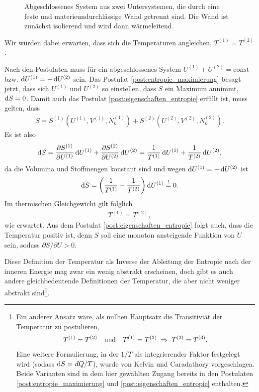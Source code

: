 \begin{figure}[htbp]
    \centering
    \tfigDoppelsystemUSfesteWaermeleitendeWand
    \caption{Abgeschlossenes System aus zwei Untersystemen, die durch eine feste und materieundurchlässige Wand getrennt sind. Die Wand ist zunächst isolierend und wird dann wärmeleitend.}
    \label{fig:DoppelsystemUSfesteWaermeleitendeWand}
\end{figure}

Wir würden dabei erwarten, dass sich die Temperaturen angleichen, $T^{(1)}=T^{(2)}$. 

Nach den Postulaten muss für ein abgeschlossenes System $U^{(1)}+U^{(2)} = \mathrm{const}$ bzw. $\mathop{}\!\mathrm{d} U^{(1)} = -\mathop{}\!\mathrm{d} U^{(2)}$ sein. Das Postulat \ref{post:entropie_maximierung} besagt jetzt, dass sich $U^{(1)}$ und $U^{(2)}$ so einstellen, dass $S$ ein Maximum annimmt, $\mathop{}\!\mathrm{d} S=0$. Damit auch das Postulat \ref{post:eigenschaften_entropie} erfüllt ist, muss gelten, dass
\begin{align*}
    S=S^{(1)}\left(U^{(1)},V^{(1)},N^{(1)}_k\right) + S^{(2)}\left(U^{(2)},V^{(2)},N^{(2)}_k\right). 
\end{align*}
Es ist also 
\begin{align*}
    \mathop{}\!\mathrm{d} S = \frac{\partial S^{(1)}}{\partial U^{(1)}}\mathop{}\!\mathrm{d} U^{(1)}+ \frac{\partial S^{(2)}}{\partial U^{(2)}}\mathop{}\!\mathrm{d} U^{(2)} = \frac{1}{T^{(1)}}\mathop{}\!\mathrm{d} U^{(1)} + \frac{1}{T^{(2)}}\mathop{}\!\mathrm{d} U^{(2)},
\end{align*}
da die Volumina und Stoffmengen konstant sind und wegen $\mathop{}\!\mathrm{d} U^{(1)} = -\mathop{}\!\mathrm{d} U^{(2)}$ ist 
\begin{align*}
    \mathop{}\!\mathrm{d} S = \left(\frac{1}{T^{(1)}}-\frac{1}{T^{(2)}}\right)\mathop{}\!\mathrm{d} U^{(1)} \overset{!}{=} 0. 
\end{align*}
Im thermischen Gleichgewicht gilt folglich 
\begin{align}
    \label{eq:thermisches_gg_temperatur}
    T^{(1)} = T^{(2)},
\end{align}
wie erwartet. Aus dem Postulat \ref{post:eigenschaften_entropie} folgt auch, dass die Temperatur positiv ist, denn $S$ soll eine monoton ansteigende Funktion von $U$ sein, sodass $\partial S/\partial U > 0$. 

Diese Definition der Temperatur als Inverse der Ableitung der Entropie nach der inneren Energie mag zwar ein wenig abstrakt erscheinen, doch gibt es auch andere gleichbedeutende Definitionen der Temperatur, die aber nicht weniger abstrakt sind\footnote{Ein anderer Ansatz wäre, als nullten Hauptsatz die Transitiviät der Temperatur zu postulieren\cite{lit:nolting1}, 
\begin{align*}
    T^{(1)} = T^{(2)} \quad \text{und}\quad T^{(1)} = T^{(3)} \;\Rightarrow\; T^{(2)} = T^{(3)}.
\end{align*} 
Eine weitere Formulierung, in der $1/T$ als integrierender Faktor festgelegt wird (sodass $\diff S=\udiff Q/T$), wurde von Kelvin und Caradathory vorgeschlagen. 
Beide Varianten sind in dem hier gewählten Zugang bereits in den Postulaten \ref{post:entropie_maximierung} und \ref{post:eigenschaften_entropie} enthalten. 
}.

